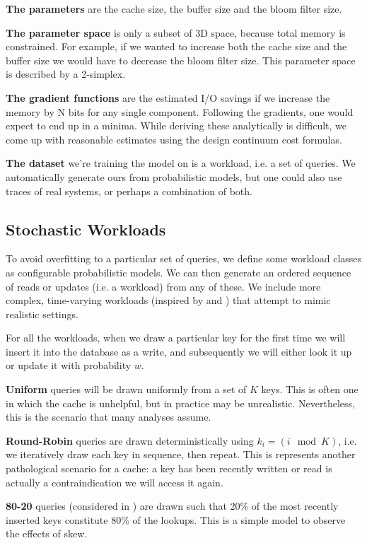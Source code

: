 \documentclass{cidr-2019}
\begin{document}
\textbf{The parameters} are the cache size, the buffer size and the bloom
filter size.

\textbf{The parameter space} is only a subset of 3D space, because total memory
is constrained. For example, if we wanted to increase both the cache size and
the buffer size we would have to decrease the bloom filter size. This
parameter space is described by a 2-simplex.

\textbf{The gradient functions} are the estimated I/O savings if we increase
the memory by N bits for any single component. Following the gradients, one
would expect to end up in a minima. While deriving these analytically is
difficult, we come up with reasonable estimates using the design continuum cost
formulas.

\textbf {The dataset} we're training the model on is a workload, i.e. a set of
queries. We automatically generate ours from probabilistic models, but one
could also use traces of real systems, or perhaps a combination of both.

\subsection{Stochastic Workloads}

To avoid overfitting to a particular set of queries, we define some workload
classes as configurable probabilistic models. We can then generate an ordered
sequence of reads or updates (i.e. a workload) from any of these. We include
more complex, time-varying workloads (inspired by
\cite{characterizing-memcached} and \cite{linkbench}) that attempt to mimic
realistic settings.

For all the workloads, when we draw a particular key for the first time we
will insert it into the database as a write, and subsequently we will either
look it up or update it with probability $w$.

\textbf{Uniform} queries will be drawn uniformly from a set of $K$ keys. This is
often one in which the cache is unhelpful, but in practice may be unrealistic.
Nevertheless, this is the scenario that many analyses assume.

\textbf{Round-Robin} queries are drawn deterministically using $k_i = (i \mod
K)$, i.e. we iteratively draw each key in sequence, then repeat.
This is represents another pathological scenario for a cache: a key has been
recently written or read is actually a contraindication we will access it
again.

\textbf{80-20} queries (considered in \cite{monkey}) are drawn such that 20\%
of the most recently inserted keys constitute 80\% of the lookups. This is a
simple model to observe the effects of skew.
\end{document}
